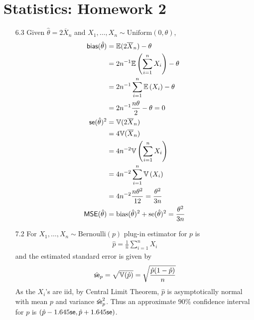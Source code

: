\documentclass[a4paper,10pt]{article}
\theoremstyle{definition}
\begin{document}
\section*{Statistics: Homework 2}

\begin{enumerate}
\item[6.3] Given $\hat{\theta} = 2\overline{X}_n$ and $X_1, \ldots, X_n \sim \text{Uniform}(0,\theta)$,
\begin{align*}
\text{\sffamily bias}(\hat{\theta}) & =\mathbb{E}(2\overline{X}_n)-\theta\\
& =2n^{-1}\mathbb{E}\left(\sum_{i=1}^{n}{X}_i\right)-\theta\\
& =2n^{-1}\sum_{i=1}^{n}\mathbb{E}\left({X}_i\right)-\theta\\
& =2n^{-1}\frac{n\theta}{2}-\theta=0\\
\text{\sffamily se}(\hat{\theta})^2 & = \mathbb{V}(2\overline{X}_n)\\
& = 4\mathbb{V}(\overline{X}_n)\\
&=4n^{-2}\mathbb{V}\left(\sum_{i=1}^{n}{X}_i\right)\\
&=4n^{-2}\sum_{i=1}^{n}\mathbb{V}\left({X}_i\right)\\
&=4n^{-2}\frac{n\theta^2}{12} = \frac{\theta^2}{3n}\\
\text{\sffamily MSE}(\hat{\theta}) &= \text{bias}(\hat{\theta})^2+\text{se}(\hat{\theta})^2 = \frac{\theta^2}{3n}
\end{align*}
\item[7.2] For $X_1, \ldots, X_n \sim \text{Bernoulli}(p)$ plug-in estimator for $p$ is 
\begin{align*}
\hat{p}=\frac{1}{n}\sum_{i=1}^{n}X_i
\end{align*}
and the estimated standard error is given by
\begin{align*}
\hat{\text{\sffamily se}}_p = \sqrt{\mathbb{V}(\hat{p})} = \sqrt{\frac{\hat{p}(1-\hat{p})}{n} }
\end{align*}
As the $X_i$'s are iid, by Central Limit Theorem, $\hat{p}$ is asymptotically normal with mean $p$ and variance $\hat{\text{\sffamily se}}_p^2$. Thus an approximate $90\%$ confidence interval for $p$ is $(\hat{p}-1.645\text{\sffamily se},\hat{p}+1.645\text{\sffamily se})$.


\end{enumerate}
\end{document}
